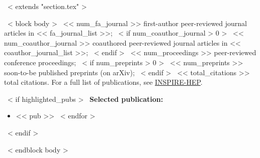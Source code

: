 ~< extends "section.tex" >~

~< block body >~
<< num_fa_journal >> first-author peer-reviewed journal articles in << fa_journal_list >>;
~< if num_coauthor_journal > 0 >~
<< num_coauthor_journal >> coauthored peer-reviewed journal articles in << coauthor_journal_list >>;
~< endif >~
<< num_proceedings >> peer-reviewed conference proceedings;
~< if num_preprints > 0 >~
<< num_preprints >> soon-to-be published preprints (on arXiv);
~< endif >~
<< total_citations >> total citations.  For a full list of publications, see \href{https://inspirehep.net/authors/<< inspire_id >>}{INSPIRE-HEP}.

~< if highlighted_pubs >~
\smallskip
\textbf{Selected publication:}
\begin{itemize}
  \setlength{\itemsep}{0pt}
  \setlength{\parskip}{0pt}
  ~< for pub in highlighted_pubs >~
  \item << pub >>
  ~< endfor >~
\end{itemize}
~< endif >~

~< endblock body >~
